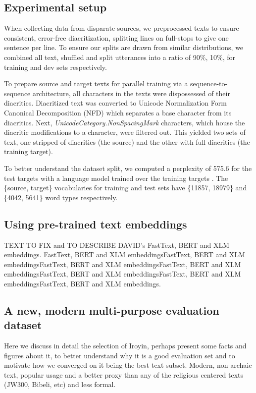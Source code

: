 \documentclass{article} %
\begin{document}
\subsection{Experimental setup}\label{sec:experimental}

 When collecting data from disparate sources, we preprocessed texts to ensure consistent, error-free diacritization, splitting lines on full-stops to give one sentence per line. To ensure our splits are drawn from similar distributions, we combined all text, shuffled and split utterances into a ratio of 90\%, 10\%, for training and dev sets respectively.   

To prepare source and target texts for parallel training via a sequence-to-sequence architecture, all characters in the texts were dispossessed of their diacritics. Diacritized text was converted to Unicode Normalization Form Canonical Decomposition (NFD) which separates a base character from its diacritics. Next, \emph{UnicodeCategory.NonSpacingMark} characters, which house the diacritic modifications to a character, were filtered out. This yielded two sets of text, one stripped of diacritics (the source) and the other with full diacritics (the training target). 

To better understand the dataset split, we computed a perplexity of 575.6 for the test targets with a language model trained over the training targets \citep{stolcke2002srilm}. The \{source, target\} vocabularies for training and test sets have \{11857, 18979\} and \{4042, 5641\} word types respectively.

\subsection{Using pre-trained text embeddings}
TEXT TO FIX and TO DESCRIBE DAVID's FastText, BERT and XLM embeddings. FastText, BERT and XLM embeddingsFastText, BERT and XLM embeddingsFastText, BERT and XLM embeddingsFastText, BERT and XLM embeddingsFastText, BERT and XLM embeddingsFastText, BERT and XLM embeddingsFastText, BERT and XLM embeddings.


\subsection{A new, modern multi-purpose evaluation dataset}\label{sec:evaldataset}

Here we discuss in detail the selection of Iroyin, perhaps present some facts and figures about it, to better understand why it is a good evaluation set and to motivate how we converged on it being the best text subset. Modern, non-archaic text, popular usage and a better proxy than any of the religious centered texts (JW300, Bibeli, etc) and less formal.
\end{document}
